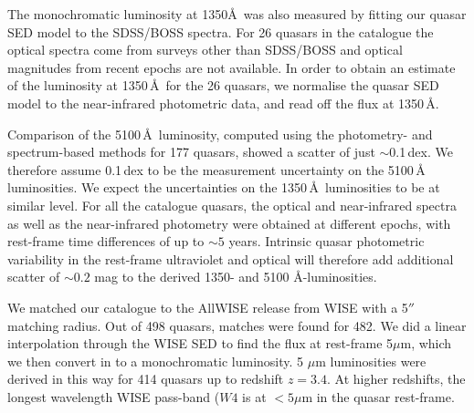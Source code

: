 The monochromatic luminosity at 1350\AA\, was also measured by fitting our quasar SED model to the SDSS/BOSS spectra. 
For 26 quasars in the catalogue the optical spectra come from surveys other than SDSS/BOSS and optical magnitudes from recent epochs are not available. 
In order to obtain an estimate of the luminosity at 1350\,\AA\, for the 26 quasars, we normalise the quasar SED model to the near-infrared photometric data, and read off the flux at 1350\,\AA. 

Comparison of the 5100\,\AA\, luminosity, computed using the photometry- and spectrum-based methods for 177 quasars, showed a scatter of just $\sim$0.1\,dex.
We therefore assume 0.1\,dex to be the measurement uncertainty on the 5100\,\AA\, luminosities.
We expect the uncertainties on the 1350\,\AA\, luminosities to be at similar level.  
For all the catalogue quasars, the optical and near-infrared spectra as well as the near-infrared photometry were obtained at different epochs, with rest-frame time differences of up to $\sim5$ years. 
Intrinsic quasar photometric variability in the rest-frame ultraviolet and optical will therefore add additional scatter of $\sim0.2$ mag \citep[e.g.][]{macleod10} to the derived 1350- and 5100 \AA-luminosities.

We matched our catalogue to the AllWISE release from WISE with a 5$''$ matching radius. 
Out of 498 quasars, matches were found for 482. 
We did a linear interpolation through the WISE SED to find the flux at rest-frame 5$\mu$m, which we then convert in to a monochromatic luminosity. 
5 $\mu$m luminosities were derived in this way for 414 quasars up to redshift $z=3.4$. 
At higher redshifts, the longest wavelength WISE pass-band ($W4$ is at $<5\mu$m in the quasar rest-frame.


